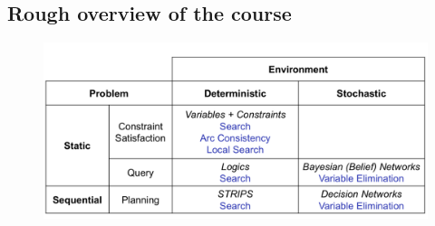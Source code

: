 \documentclass{article}
\begin{document}
\subsection*{Rough overview of the course}
\begin{figure}[H]
	\centering
	\includegraphics[width=6in]{Pic2}
\end{figure}
\end{document}
